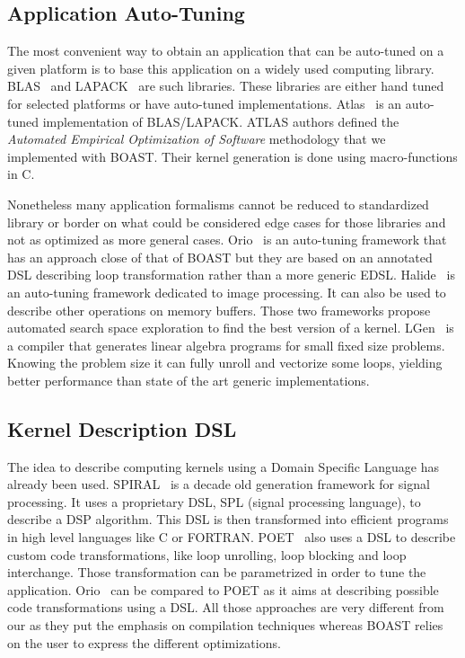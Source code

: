 \documentclass[11pt, a4paper, twoside]{montblanc}
\begin{document}
  \subsection{Application Auto-Tuning} 

  The most convenient way to obtain an application that can be auto-tuned on a
given platform is to base this application on a widely used computing library.
BLAS~\cite{dongarra1990set} and LAPACK~\cite{laug} are such libraries. These
libraries are either hand tuned for selected platforms or have auto-tuned
implementations. Atlas~\cite{whaley04} is an auto-tuned implementation of
BLAS/LAPACK. ATLAS authors defined the \emph{Automated Empirical Optimization of
Software} methodology that we implemented with BOAST. Their kernel generation is
done using macro-functions in C.

  Nonetheless many application formalisms cannot be reduced to standardized
library or border on what could be considered edge cases for those libraries and
not as optimized as more general cases. Orio~\cite{Hart2009:Orio} is an
auto-tuning framework that has an approach close of that of BOAST but they are
based on an annotated DSL describing loop transformation rather than a more
generic EDSL. Halide~\cite{ragan2013halide} is an auto-tuning framework
dedicated to image processing. It can also be used to describe other
operations on memory buffers. Those two frameworks propose automated search
space exploration to find the best version of a kernel.
LGen~\cite{spampinato2014basic} is a compiler that generates linear algebra
programs for small fixed size problems. Knowing the problem size it can fully
unroll and vectorize some loops, yielding better performance than state of the
art generic implementations.

  \subsection{Kernel Description DSL}

  The idea to describe computing kernels using a Domain Specific Language has
already been used. SPIRAL~\cite{puschel2004spiral} is a decade old generation
framework for signal processing. It uses a proprietary DSL, SPL (signal
processing language), to describe a DSP algorithm. This DSL is then transformed
into efficient programs in high level languages like C or FORTRAN.
POET~\cite{yi2007poet} also uses a DSL to describe custom code transformations,
like loop unrolling, loop blocking and loop interchange. Those transformation
can be parametrized in order to tune the application. Orio~\cite{Hart2009:Orio}
can be compared to POET as it aims at describing possible code transformations
using a DSL. All those approaches are very different from our as they put the
emphasis on compilation techniques whereas BOAST relies on the user to express
the different optimizations.
\end{document}
